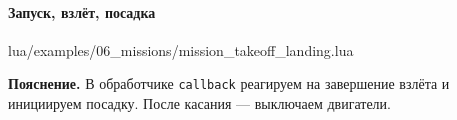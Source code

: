 \paragraph{Запуск, взлёт, посадка}
\begin{codefile}{lua/examples/06_missions/mission_takeoff_landing.lua}
\end{codefile}
\textbf{Пояснение.} В обработчике \texttt{callback} реагируем на завершение взлёта и инициируем посадку. После касания — выключаем двигатели.
